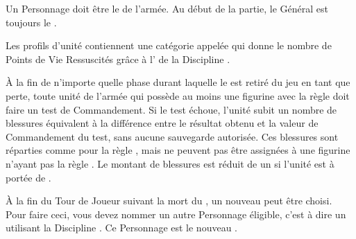 \newcommand{\greatmonstrousrevenantrule}{%
Le \monstrousrevenant{} gagne \thunderouscharge{} et sa taille de socle change en \unit{60x100}{\milli\meter}.
}

\newcommand{\colossalzombiedragonrule}{%
La figurine gagne +1 en Capacité de Combat, la valeur de sa \innatedefence{} passe à ($ 3+ $), et sa taille de socle change en \unit{100x150}{\milli\meter}.
}


\newcommand{\QRSnote}{%
\noindent$^{1}$ En Monture, le Personnage remplace le \cadavermaster{}.

\noindent$^{2}$ En Monture, le Personnage remplace une \paramour{}.
}









\startarmywiderules

\armywideruleentry{\masterofundeath}

Un Personnage doit être le \textbf{\master{}} de l'armée. Au début de la partie, le Général est toujours le \master{}.

\armywideruleentry{\invocation}

Les profils d'unité contiennent une catégorie appelée \invocation{} qui donne le nombre de Points de Vie Ressuscités grâce à l'\necromancysignaturespell{} de la Discipline \necromancy{}.

\closearmywiderules

\vspace*{1.5cm}
\startarmyspecialrules

\armyspecialruleentry{\ashestoashes}

À la fin de n'importe quelle phase durant laquelle le \master{} est retiré du jeu en tant que perte, toute unité de l'armée qui possède au moins une figurine avec la règle \ashestoashes{} doit faire un test de Commandement. Si le test échoue, l'unité subit un nombre de blessures équivalent à la différence entre le résultat obtenu et la valeur de Commandement du test, sans aucune sauvegarde autorisée. Ces blessures sont réparties comme pour la règle \unstable{}, mais ne peuvent pas être assignées à une figurine n'ayant pas la règle \ashestoashes{}. Le montant de blessures est réduit de un si l'unité est à portée de \holdyourground{}.

À la fin du Tour de Joueur suivant la mort du \master{}, un nouveau \master{} peut être choisi. Pour faire ceci, vous devez nommer un autre Personnage éligible, c'est à dire un \wizard{} utilisant la Discipline \necromancy{}. Ce Personnage est le nouveau \master{}.


